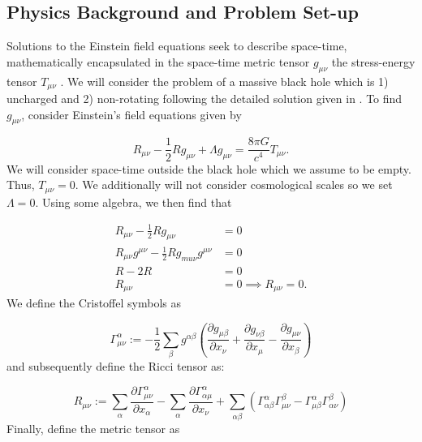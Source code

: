 \documentclass{CUP-JNL-DTM}%
\theoremstyle{definition}
\numberwithin{equation}{section}
\begin{document}
\subsection{Physics Background and Problem Set-up}

Solutions to the Einstein field equations seek to describe space-time, mathematically encapsulated in the space-time metric tensor $g_{\mu\nu}$ the stress-energy tensor $T_{\mu\nu}$ . We will consider the problem of a massive black hole which is 1) uncharged and 2) non-rotating following the detailed solution given in \cite{eigenchrisRelativity108aSchwarzschild}. To find $g_{\mu\nu}$, consider Einstein's field equations given by 

\begin{equation}
    R_{\mu\nu} - \frac{1}{2}R g_{\mu\nu} + \Lambda g_{\mu\nu} = \frac{8 \pi G}{c^4}T_{\mu\nu}.
    \label{eqn:EFE}
\end{equation}
We will consider space-time outside the black hole which we assume to be empty. Thus, $T_{\mu\nu} = 0$. We additionally will not consider cosmological scales so we set $\Lambda = 0$. Using some algebra, we then find that

\begin{equation}
\begin{split}
    R_{\mu\nu} - \frac{1}{2}Rg_{\mu\nu} & = 0 \\
    R_{\mu\nu}g^{\mu\nu} - \frac{1}{2}Rg_{mu\nu}g^{\mu\nu} & = 0 \\
    R - 2R & = 0 \\ 
    R_{\mu\nu} & = 0 \implies \boxed{R_{\mu\nu} = 0}. 
\end{split}
\end{equation}
We define the Cristoffel symbols as

\begin{equation}
    \Gamma^{\alpha}_{\mu\nu} := -\frac{1}{2}\sum_{\beta}g^{\alpha\beta}\left(\frac{\partial g_{\mu\beta}}{\partial x_{\nu}} + \frac{\partial g_{\nu\beta}}{\partial x_{\mu}} - \frac{\partial g_{\mu\nu}}{\partial x_{\beta}}\right)
    \label{eqn:ccs}
\end{equation}
and subsequently define the Ricci tensor as:

\begin{equation}
    R_{\mu\nu} := \sum_{\alpha} \frac{\partial \Gamma^{\alpha}_{\mu\nu}}{\partial x_{\alpha}} - \sum_{\alpha} \frac{\partial \Gamma^{\alpha}_{\alpha\mu}}{\partial x_{\nu}} + \sum_{\alpha\beta} \left(\Gamma^{\alpha}_{\alpha\beta} \Gamma^{\beta}_{\mu\nu} - \Gamma^{\alpha}_{\mu\beta} \Gamma^{\beta}_{\alpha\nu}\right)
    \label{eqn:ricci}
\end{equation}
Finally, define the metric tensor as 
\end{document}
